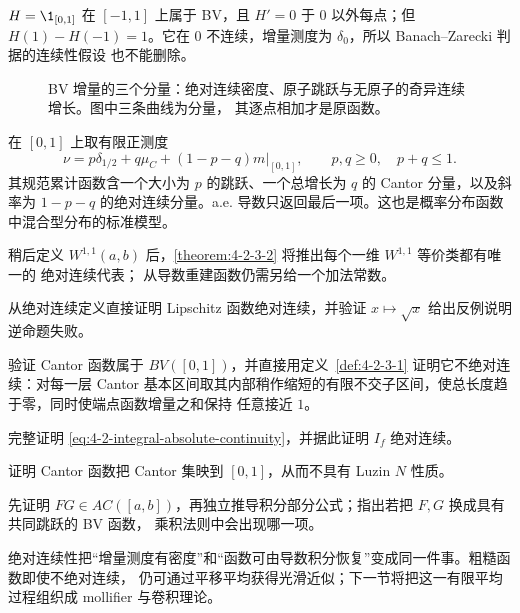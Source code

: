 \begin{example}[跳跃函数的失败]\label{ex:4-2-3-3}
$H=\1_{[0,1]}$ 在 $[-1,1]$ 上属于 BV，且 $H'=0$ 于 $0$ 以外每点；但
$H(1)-H(-1)=1$。它在 $0$ 不连续，增量测度为 $\delta_0$，所以 Banach--Zarecki 判据的连续性假设
也不能删除。
\end{example}

\begin{figure}[htbp]
\centering
{}
\caption{BV 增量的三个分量：绝对连续密度、原子跳跃与无原子的奇异连续增长。图中三条曲线为分量，
其逐点相加才是原函数。}
\label{fig:bv-three-parts}
\end{figure}

\begin{remark}[混合测度的累计函数]
在 $[0,1]$ 上取有限正测度
\[
 \nu=p\delta_{1/2}+q\mu_C+(1-p-q)m|_{[0,1]},
 \qquad p,q\ge0,\quad p+q\le1.
\]
其规范累计函数含一个大小为 $p$ 的跳跃、一个总增长为 $q$ 的 Cantor 分量，以及斜率为
$1-p-q$ 的绝对连续分量。a.e. 导数只返回最后一项。这也是概率分布函数中混合型分布的标准模型。
\end{remark}

稍后定义 $W^{1,1}(a,b)$ 后，\cref{theorem:4-2-3-2} 将推出每个一维 $W^{1,1}$ 等价类都有唯一的
绝对连续代表；
从导数重建函数仍需另给一个加法常数。

\begin{exercise}
从绝对连续定义直接证明 Lipschitz 函数绝对连续，并验证 $x\mapsto\sqrt x$ 给出反例说明逆命题失败。
\end{exercise}
\begin{exercise}
验证 Cantor 函数属于 $BV([0,1])$，并直接用定义~\ref{def:4-2-3-1} 证明它不绝对连续：对每一层
Cantor 基本区间取其内部稍作缩短的有限不交子区间，使总长度趋于零，同时使端点函数增量之和保持
任意接近 $1$。
\end{exercise}
\begin{exercise}
完整证明 \eqref{eq:4-2-integral-absolute-continuity}，并据此证明 $I_f$ 绝对连续。
\end{exercise}
\begin{exercise}
证明 Cantor 函数把 Cantor 集映到 $[0,1]$，从而不具有 Luzin $N$ 性质。
\end{exercise}
\begin{exercise}
先证明 $FG\in AC([a,b])$，再独立推导积分部分公式；指出若把 $F,G$ 换成具有共同跳跃的 BV 函数，
乘积法则中会出现哪一项。
\end{exercise}

绝对连续性把“增量测度有密度”和“函数可由导数积分恢复”变成同一件事。粗糙函数即使不绝对连续，
仍可通过平移平均获得光滑近似；下一节将把这一有限平均过程组织成 mollifier 与卷积理论。
